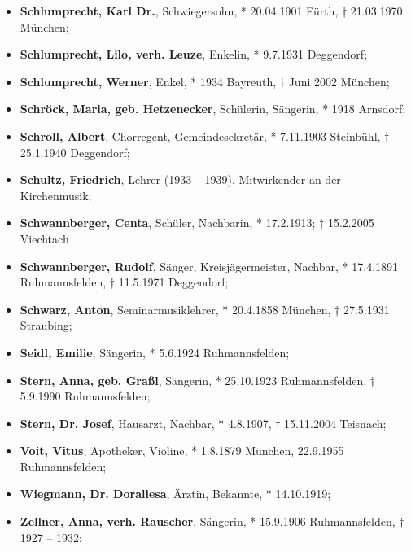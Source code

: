 \begin{itemize}
\item \textbf{Schlumprecht, Karl Dr.}, Schwiegersohn,
* 20.04.1901 Fürth, † 21.03.1970 München;

\item \textbf{Schlumprecht, Lilo, verh. Leuze}, Enkelin, * 9.7.1931
Deggendorf;

\item \textbf{Schlumprecht, Werner}, Enkel, * 1934 Bayreuth, † Juni 2002
München;

\item \textbf{Schröck, Maria, geb. Hetzenecker}, Schülerin, Sängerin, *
1918 Arnsdorf;

\item \textbf{Schroll, Albert}, Chorregent, Gemeindesekretär, *
7.11.1903 Steinbühl,  † 25.1.1940 Deggendorf;

\item \textbf{Schultz, Friedrich}, Lehrer (1933 – 1939),
Mitwirkender an der Kirchenmusik;

\item \textbf{Schwannberger, Centa}, Schüler, Nachbarin, * 17.2.1913; †
15.2.2005 Viechtach

\item \textbf{Schwannberger, Rudolf}, Sänger, Kreisjägermeister,
Nachbar, * 17.4.1891 Ruhmannsfelden, † 11.5.1971 Deggendorf;

\item \textbf{Schwarz, Anton}, Seminarmusiklehrer, * 20.4.1858 München,
† 27.5.1931 Straubing;

\item \textbf{Seidl, Emilie}, Sängerin, * 5.6.1924 Ruhmannsfelden;

\item \textbf{Stern, Anna, geb. Graßl}, Sängerin, * 25.10.1923
Ruhmannsfelden, † 5.9.1990 Ruhmannsfelden;

\item \textbf{Stern, Dr. Josef}, Hausarzt, Nachbar, * 4.8.1907, †
15.11.2004 Teisnach;

\item \textbf{Voit, Vitus}, Apotheker, Violine, * 1.8.1879 München,
22.9.1955 Ruhmannsfelden;

\item \textbf{Wiegmann, Dr. Doraliesa}, Ärztin, Bekannte, * 14.10.1919;

\item \textbf{Zellner, Anna, verh. Rauscher}, Sängerin, * 15.9.1906
Ruhmannsfelden, † 1927 – 1932;

\end{itemize}